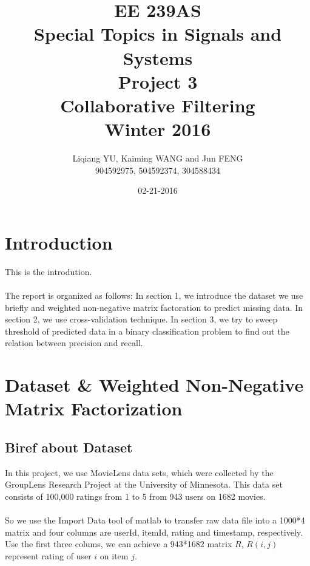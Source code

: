 \documentclass{article}
\begin{document}
\begin{titlepage}
\title{EE 239AS \\Special Topics in Signals and Systems\\Project 3\\Collaborative Filtering\\Winter 2016} 
\author{Liqiang YU, Kaiming WANG and Jun FENG\\
904592975, 504592374, 304588434} 
\date{02-21-2016}
\end{titlepage}

\maketitle
\newpage
\tableofcontents
\newpage
\section{Introduction}
This is the introdution.
\\
\\
The report is organized as follows: In section 1, we introduce the dataset we use briefly and weighted non-negative matrix factoration to predict missing data. In section 2, we use cross-validation technique. In section 3, we try to sweep threshold of predicted data in a binary classification problem to find out the relation between precision and recall.
\section{Dataset  \& Weighted Non-Negative Matrix Factorization}
\subsection{Biref about Dataset}
In this project, we use MovieLens data sets, which were collected by the GroupLens Research Project at the University of Minnesota. This data set consists of 100,000 ratings from 1 to 5 from 943 users on 1682 movies. \\
\\
So we use the Import Data tool of matlab to transfer raw data file into a 1000*4 matrix and four columns are userId, itemId, rating and timestamp, respectively. Use the first three colums, we can achieve a 943*1682 matrix $R$, $R(i,j)$ represent rating of user $i$ on item $j$.
\end{document}
